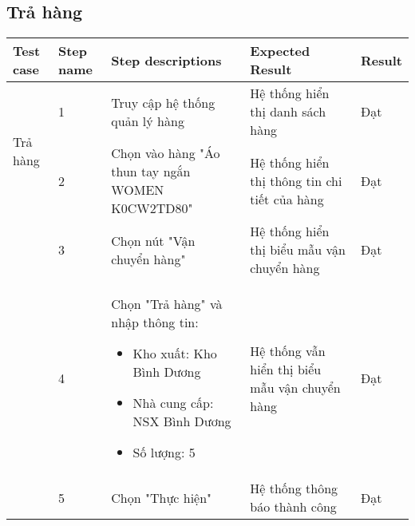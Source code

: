\subsection{Trả hàng}
{
    \setlength\extrarowheight{6pt}
    \begin{longtable}{| p{2.5cm}| p{1cm}| p{5.5cm}| p{4.5cm} | p{1.5cm} |}
        \hline
        \textbf{Test case} & \textbf{Step name} & \textbf{Step descriptions} & \textbf{Expected Result} & \textbf{Result} \\
        \hline
        \multirow[t]{2}{2.5cm}{Trả hàng} & 1 & Truy cập hệ thống quản lý hàng & Hệ thống hiển thị danh sách hàng & Đạt \\
        \cline{2-5}
         & 2 & Chọn vào hàng "Áo thun tay ngắn WOMEN K0CW2TD80" & Hệ thống hiển thị thông tin chi tiết của hàng & Đạt \\
        \cline{2-5}
        & 3 & Chọn nút "Vận chuyển hàng" & Hệ thống hiển thị biểu mẫu vận chuyển hàng & Đạt \\
        \cline{2-5}
         & 4 & Chọn "Trả hàng" và nhập thông tin:
         \begin{itemize}
            \item Kho xuất: Kho Bình Dương
            \item Nhà cung cấp: NSX Bình Dương
            \item Số lượng: 5
         \end{itemize}
         & Hệ thống vẫn hiển thị biểu mẫu vận chuyển hàng & Đạt \\
         \cline{2-5}
         & 5 & Chọn "Thực hiện" & Hệ thống thông báo thành công & Đạt \\
        \hline
    \end{longtable} 
}


